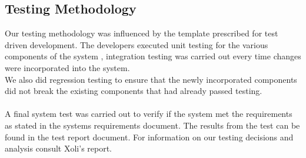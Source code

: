 \documentclass[a4paper,12pt]{Article}
\begin{document}
\subsection{Testing Methodology}
Our testing methodology was influenced  by  the template prescribed for test driven development.  The developers executed unit testing for the various components of the system , integration testing was carried out every time changes were  incorporated into the system.
\\We also did regression testing to ensure that the newly incorporated components did not break the existing components that had already passed testing. 
\\\\A final system test was carried out to verify if the system met the requirements as stated in the systems requirements document. The results from the test can be found in the test report document. For information on our testing decisions and analysis consult Xoli’s report.
\end{document}
